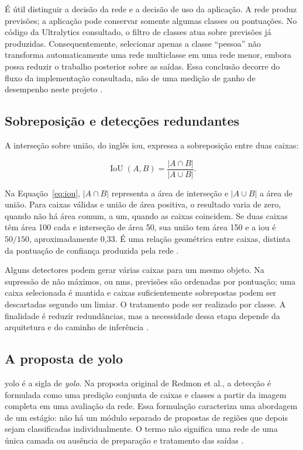 É útil distinguir a decisão da rede e a decisão de uso da aplicação. A rede produz previsões; a aplicação pode conservar somente algumas classes ou pontuações. No código da Ultralytics consultado, o filtro de classes atua sobre previsões já produzidas. Consequentemente, selecionar apenas a classe ``pessoa'' não transforma automaticamente uma rede multiclasse em uma rede menor, embora possa reduzir o trabalho posterior sobre as saídas. Essa conclusão decorre do fluxo da implementação consultada, não de uma medição de ganho de desempenho neste projeto \cite{ultralytics-nms}.

\subsection{Sobreposição e detecções redundantes}
\label{subsec:sobreposicao-nms}

A interseção sobre união, do inglês \gls{iou}, expressa a sobreposição entre duas caixas:

\begin{equation}
    \label{eq:iou}
    \operatorname{IoU}(A,B) = \frac{|A\cap B|}{|A\cup B|}.
\end{equation}

Na Equação~\ref{eq:iou}, $|A\cap B|$ representa a área de interseção e $|A\cup B|$ a área de união. Para caixas válidas e união de área positiva, o resultado varia de zero, quando não há área comum, a um, quando as caixas coincidem. Se duas caixas têm área 100 cada e interseção de área 50, sua união tem área 150 e a \gls{iou} é \(50/150\), aproximadamente 0,33. É uma relação geométrica entre caixas, distinta da pontuação de confiança produzida pela rede \cite[seção 3]{iou}.

Alguns detectores podem gerar várias caixas para um mesmo objeto. Na supressão de não máximos, ou \gls{nms}, previsões são ordenadas por pontuação; uma caixa selecionada é mantida e caixas suficientemente sobrepostas podem ser descartadas segundo um limiar. O tratamento pode ser realizado por classe. A finalidade é reduzir redundâncias, mas a necessidade dessa etapa depende da arquitetura e do caminho de inferência \cite{ultralytics-nms}.

\subsection{A proposta de \texorpdfstring{\acrshort{yolo}}{YOLO}}
\label{subsec:proposta-yolo}

\acrshort{yolo} é a sigla de \textit{\acrlong{yolo}}. Na proposta original de Redmon et al., a detecção é formulada como uma predição conjunta de caixas e classes a partir da imagem completa em uma avaliação da rede. Essa formulação caracteriza uma abordagem de um estágio: não há um módulo separado de propostas de regiões que depois sejam classificadas individualmente. O termo não significa uma rede de uma única camada ou ausência de preparação e tratamento das saídas \cite{yolo-original}.

